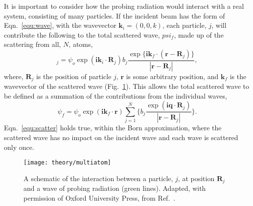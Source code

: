 It is important to consider how the probing radiation would interact with a real system, consisting of many particles.
If the incident beam has the form of Eqn.~\ref{equ:wave}, with the wavevector $\mathbf{k}_i = (0, 0, k)$, each particle, $j$, will contribute the following to the total scattered wave, $psi_f$, made up of the scattering from all, $N$, atoms,
%
\begin{equation}
	[\delta\psi_f]_j = \psi_o\exp{(\mathbf{ik}_i\cdot \mathbf{R}_j)}b_j\frac{\exp{\big\{\mathbf{ik}_f\cdot (\mathbf{r}-\mathbf{R}_j)\big\}}}{|\mathbf{r}-\mathbf{R}_j|},
\end{equation}
%
where, $\mathbf{R}_j$ is the position of particle $j$, $\mathbf{r}$ is some arbitrary position, and $\mathbf{k}_f$ is the wavevector of the scattered wave (Fig.~\ref{fig:multiatom}).
This allows the total scattered wave to be defined as a summation of the contributions from the individual waves,
%
\begin{equation}
	\psi_f = \psi_o \exp{(\mathbf{ik}_f\cdot\mathbf{r})}\sum_{j=1}^{N}\bigg\{b_j \frac{\exp{(\mathbf{iq}\cdot \mathbf{R}_j)}}{|\mathbf{r}-\mathbf{R}_j|}\bigg\}.
	\label{equ:scatter}
\end{equation}
%
Eqn.~\ref{equ:scatter} holds true, within the Born approximation, where the scattered wave has no impact on the incident wave and each wave is scattered only once.
%
\begin{figure}
	\centering
	\texttt{[image: theory/multiatom]}
	\caption{A schematic of the interaction between a particle, $j$, at position $\mathbf{R}_j$ and a wave of probing radiation (green lines). Adapted, with permission of Oxford University Press\textsuperscript{\textcopyright}, from Ref.~\cite{Sivia2011}.}
	\label{fig:multiatom}
\end{figure}
%


